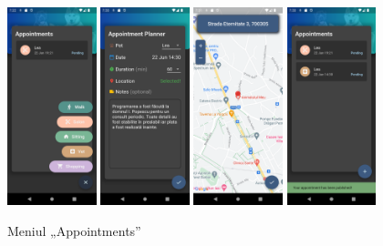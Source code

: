 \begin{figure}[ht]
    \centering
    \includegraphics[width=0.23\textwidth]{images/screenshots/new_appointment.png}
    \includegraphics[width=0.23\textwidth]{images/screenshots/create_appointment.png}
    \includegraphics[width=0.23\textwidth]{images/screenshots/location_picker.png}
    \includegraphics[width=0.23\textwidth]{images/screenshots/appointments.png}

    \caption{Meniul „Appointments”}
    \label{fig:appointments}
\end{figure}

